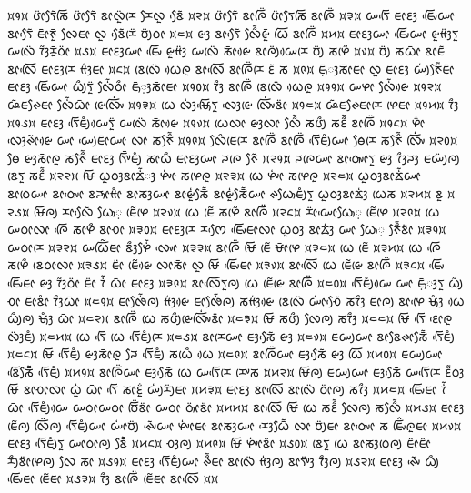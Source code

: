 \noindent
᰿᱁᰿ ᰂᰦᰮᰛᰧᰶᰕᰩ ᰂᰦᰮᰛᰧᰶ ᰣᰦᰜᰬᰮᰌᰨ ᰌᰧᰜᰬ ᰣᰧᰵᰶ ᰿᱂᰿ ᰂᰦᰮᰛᰧᰶ ᰣᰦᰍᰩᰮ ᰂᰦᰮᰛᰧᰕᰩ ᰣᰦᰍᰩᰮ ᰿᱃᰿ ᰠᰛᰩᰵ ᰀᰦᰚᰫ ᰀᰤᰩᰵᰠᰦ ᰣᰦᰛᰧᰵᰶ ᰀᰦᰳᰉᰬᰳ ᰜᰧᰀᰦ ᰜᰬ ᰣᰧᰵᰶᰌᰨᰮ ᰗᰪᰮᰓᰦ ᰿᱄᰿ ᰡᰫ ᰣᰦᰛᰧᰵᰶ ᰜᰧᰰᰶᰡᰬᰳ ᰃᰩ ᰣᰦᰍᰩᰮ ᰿᱅᰿ ᰀᰦᰚᰫᰠᰦ ᰀᰤᰩᰵᰠᰦ ᰡᰬᰙᰫᰮᰛᰬ ᰠᰜᰨᰮ ᰅᰫᰰᰌᰬᰳᰓᰦᰮ ᰿᱆᰿ ᰀᰦᰚᰫᰠᰦ ᰀᰤᰩᰵ ᰡᰬᰙᰫᰮ ᰠᰜᰨᰮ ᰕᰦᰳᰡᰴ ᰣᰦᰍᰪᰮᰠᰴᰌᰨ ᰗᰪᰮ ᰕᰋᰨᰰ ᰿᱇᰿ ᰗᰪᰮ ᰕᰃᰦᰳ ᰣᰦᰀᰶ ᰣᰦᰜᰩᰵ ᰀᰦᰚᰫᰌᰨ ᰙᰫᰭᰀᰦ ᰿᱈᰿ ᰣᰨᰜᰨᰮ ᰃᰴᰍᰬ ᰣᰦᰜᰩᰵ ᰣᰦᰍᰩᰮᰌᰨ ᰚᰶ ᰕ ᰿᱉᰿ ᰀ᰷ᰥᰳᰫᰕᰦᰳᰀᰦ ᰜᰬ ᰀᰦᰚᰫ ᰠᰪᰭᰉᰧᰮᰶᰀᰦᰳ ᰀᰦᰚᰫ ᰀᰤᰩᰵᰠᰦ ᰃᰪᰰᰛᰬᰮ ᰜᰧᰭᰶᰓᰦᰰ ᰀᰥᰳ᰷ᰫᰕᰦᰳᰀᰦ ᰿᱁᱀᰿ ᰅᰫᰰ ᰣᰦᰍᰩᰮ ᰣᰨᰜᰨᰮ ᰃᰴᰍᰬ ᰿᱁᱁᰿ ᰠᰋᰦ ᰜᰧᰭᰶᰡᰴ ᰿᱁᱂᰿ ᰘᰶᰀᰊᰧᰀᰦ ᰜᰧᰭᰶᰃᰦᰳ ᰡᰨᰜᰤᰩᰭ ᰿᱁᱃᰿ ᰃᰨ ᰜᰫᰭᰝᰥᰩᰵᰛᰬ ᰜᰫᰵᰡᰨ ᰜᰤᰩᰭᰣᰦᰮ ᰿᱁᱄᰿ ᰘᰶᰀᰊᰧᰀᰦᰌᰨ ᰋᰨᰀᰦ ᰿᱁᱅᰿ ᰅᰫᰰ ᰿᱁᱆᰿ ᰀᰦᰚᰫ ᰛᰩᰵᰀᰪᰱᰠᰴᰛᰬᰮ ᰠᰜᰨᰮ ᰕᰦᰳᰡᰴ ᰿᱁᱇᰿ ᰃᰨᰜᰦ ᰡᰫᰜᰦ ᰜᰧᰰᰶ ᰕᰂᰪᰰ ᰕᰚᰰᰶ ᰣᰦᰍᰩᰮ ᰿᱁᱈᰿ ᰋᰦᰯ ᰜᰫᰵᰊᰦᰲᰡᰴ ᰠᰦ ᰠᰪᰵᰀᰦᰳᰠᰦ ᰜᰦ ᰕᰉᰧᰰᰶ ᰿᱁᱉᰿ ᰜᰧᰰᰀᰨᰌᰨ ᰣᰦᰍᰩᰮ ᰣᰦᰍᰩᰮ ᰛᰩᰵᰀᰪᰱᰠᰦ ᰟᰧᰌᰨ ᰕᰉᰧᰰᰶ ᰜᰤᰩᰭ ᰿᱂᱀᰿ ᰟᰧ ᰡᰫᰕᰦᰳᰍᰬ ᰕᰉᰧᰰᰶ ᰀᰦᰚᰫ ᰛᰤᰩᰳᰀᰪᰱ ᰕᰦᰃᰰ ᰀᰦᰚᰫᰠᰦ ᰎᰍᰨ ᰉᰧᰶ ᰿᱂᱁᰿ ᰎᰍᰨᰠᰦ ᰣᰦᰓᰥᰤᰦᰵᰛᰬ ᰡᰫ ᰅᰫᰰᰎᰫ ᰀᰠᰪᰮᰍᰪ ᰣᰨᰛᰬ ᰕᰚᰰᰶ ᰿᱂᱂᰿ ᰝᰩ ᰃᰬᰓᰫᰣᰦᰇᰭᰶᰫ ᰋᰤᰦᰭ ᰕᰋᰨᰍᰬ ᰿᱂᱃᰿ ᰃᰨ ᰋᰤᰦᰭ ᰕᰋᰨᰍᰬ ᰿᱂᱄᰿ ᰃᰬᰓᰫᰣᰦᰇᰭᰶᰠᰦ ᰣᰦᰓᰨᰠᰦ ᰣᰦᰓᰥᰤᰦᰵ ᰣᰎᰥᰦᰙᰦᰱ ᰣᰦᰕᰫᰠᰦ ᰣᰦᰡᰬᰭᰕᰧᰳᰶ ᰣᰦᰡᰬᰭᰕᰧᰳᰶᰠᰦ ᰊᰃᰥᰧᰀᰪᰱᰛᰬ ᰃᰬᰓᰫᰣᰦᰇᰫᰭ ᰃᰨᰕ ᰿᱂᱅᰿ ᰣᰬ ᰿᱂᱆᰿ ᰝᰩᰍᰪ ᰌᰦᰜᰧᰵᰶ ᰃᰥᰧ᰷ ᰀᰨᰲᰋᰨ ᰿᱂᱇᰿ ᰃᰨ ᰀᰨᰲ ᰕᰋᰨᰰ ᰣᰦᰍᰩᰮ ᰿᱂᱈᰿ ᰌᰦᰮᰠᰦᰵᰃᰥᰧ᰷ ᰀᰨᰲᰋᰨ ᰿᱂᱉᰿ ᰃᰨ ᰠᰓᰦᰜᰦ ᰍᰩᰵ ᰕᰦᰋᰰ ᰣᰦᰆᰦ ᰿᱃᱀᰿ ᰀᰦᰚᰫᰌᰨ ᰌᰔᰧᰵ ᰀᰤᰩᰵᰀᰦᰜᰦ ᰃᰬᰓᰫ ᰣᰦᰇᰫᰭ ᰠᰦ ᰃᰥᰧ᰷ ᰉᰧᰰᰶᰣᰦᰮ ᰿᱃᱁᰿ ᰠᰓᰦᰌᰨ ᰿᱃᱂᰿ ᰠᰃᰩᰲᰀᰦ ᰣᰫᰰᰋᰧᰭᰶ ᰜᰤᰦᰵ ᰿᱃᱃᰿ ᰣᰦᰍᰩᰮ ᰝᰩ ᰀᰨᰲ ᰝᰦᰳᰋᰨ ᰿᱃᱄᰿ ᰃᰨ ᰀᰨᰲ ᰿᱃᱅᰿ ᰃᰨ ᰍᰩᰵ ᰕᰋᰨᰰ ᰣᰨᰓᰦᰜᰦ ᰿᱃᱆᰿ ᰀᰦᰮ ᰀᰨᰲᰡᰴ ᰜᰦᰕᰦᰳ ᰜᰬ ᰝᰩ ᰀᰤᰩᰵᰀᰦ ᰿᱃᱇᰿ ᰣᰦᰜᰩᰵ ᰃᰨ ᰀᰨᰲᰡᰨ ᰣᰦᰍᰩᰮ ᰿᱃᱈᰿ ᰀᰤᰩᰵ ᰀᰤᰩᰵᰀᰦ ᰡᰫ ᰅᰫᰰᰓᰦᰮ ᰀᰦᰮ ᰅᰭᰶ ᰃᰦᰳ ᰀᰦᰚᰫ ᰿᱃᱉᰿ ᰣᰦᰜᰩᰵᰛᰬᰍᰪ ᰃᰨ ᰀᰨᰲᰡᰨ ᰣᰦᰍᰩᰮ ᰿᱄᱀᰿ ᰛᰩᰵᰀᰪᰱᰠᰴ ᰠᰦ ᰀ᰷ᰥᰳᰫᰛᰬ ᰃᰪᰰ ᰆᰦ ᰀᰦᰳᰣᰦᰱ ᰅᰫᰰᰃᰦᰳ ᰿᱄᱁᰿ ᰀᰦᰒᰧᰭᰶᰍᰪ ᰙᰫᰭᰡᰴ ᰀᰦᰒᰧᰭᰶᰍᰪ ᰕᰙᰫᰭᰡᰴ ᰣᰨᰜᰨᰮ ᰠᰦᰭᰆᰧᰵᰶ ᰕᰅᰫᰰ ᰀᰦᰳᰍᰪ ᰣᰦᰋᰨᰵ ᰝᰥᰫᰱ ᰃᰴ ᰃᰪᰰᰍᰪ ᰝᰥᰫᰱ ᰃᰦᰳ ᰿᱄᱂᰿ ᰣᰦᰍᰩᰮ ᰃᰨ ᰕᰂᰪᰰᰡᰨᰜᰤᰩᰭᰣᰦᰮ ᰿᱄᱃᰿ ᰝᰩ ᰕᰂᰪᰰ ᰜᰧᰍᰪ ᰕᰅᰫᰰ ᰿᱄᱄᰿ ᰝᰩ ᰛᰩᰵ ᰚᰦᰵᰍᰬ ᰜᰫᰮᰀᰪᰱ ᰿᱄᱅᰿ ᰃᰨ ᰛᰩᰵ ᰃᰨ ᰛᰩᰵᰀᰪᰱᰌᰨ ᰿᱄᱆᰿ ᰣᰦᰌᰨᰠᰦ ᰀᰫᰕᰧᰵᰶ ᰡᰫ ᰿᱄᱇᰿ ᰀᰠᰪᰠᰦ ᰣᰦᰣᰧᰊᰦᰕᰧᰳᰶ ᰛᰩᰵᰀᰪᰱ ᰿᱄᱈᰿ ᰝᰩ ᰛᰩᰵᰀᰪᰱ ᰡᰫᰕᰦᰳᰍᰬ ᰎᰧ ᰛᰩᰵᰀᰪᰱ ᰕᰃᰨᰰ ᰃᰴ ᰿᱄᱉᰿ ᰣᰦᰍᰩᰮᰠᰦ ᰀᰫᰕᰧᰵᰶ ᰡᰫ ᰃᰩ ᰿᱅᱀᰿ ᰀᰠᰪᰠᰦ ᰣᰩᰵᰕᰧᰳᰶ ᰛᰩᰵᰀᰪᰱ ᰿᱅᱁᰿ ᰣᰦᰍᰩᰮᰠᰦ ᰀᰫᰕᰧᰵᰶ ᰃᰨ ᰠᰛᰩᰵᰌᰨ ᰌᰤᰨᰕ ᰿᱅᱂᰿ ᰝᰩᰍᰪ ᰀᰠᰪᰠᰦ ᰀᰫᰕᰧᰵᰶ ᰠᰛᰩᰵᰌᰨ ᰚᰮᰶᰓᰫ ᰝᰩ ᰣᰦᰆᰦᰜᰦ ᰃᰬᰭ ᰃᰦᰳ ᰛᰩᰵ ᰕᰦᰚᰬᰯ ᰠᰪᰭᰌᰪᰮᰀᰦ ᰿᱅᱃᰿ ᰀᰦᰚᰫ ᰣᰦᰜᰩᰵ ᰣᰦᰜᰨᰮ ᰓᰦᰮᰍᰪ ᰕᰅᰫᰰ ᰿᱅᱄᰿ ᰀᰤᰩᰵᰀᰦ ᰅᰭᰶ ᰃᰦᰳ ᰛᰩᰵᰀᰪᰱᰠᰴ ᰠᰓᰦᰠᰓᰦ ᰗᰩᰮᰣᰦᰮ ᰠᰓᰦ ᰓᰥᰦᰮᰣᰦᰮ ᰿᱅᱅᰿ ᰣᰦᰜᰩᰵ ᰝᰩ ᰃᰨ ᰕᰚᰰᰶ ᰜᰧᰍᰪ ᰕᰜᰧᰰᰶ ᰿᱅᱆᰿ ᰀᰦᰚᰫ ᰀᰨᰲᰍᰪ ᰜᰩᰮᰍᰪ ᰛᰩᰵᰀᰪᰱᰠᰦ ᰠᰦᰭᰗᰪᰮ ᰊᰤᰵᰶᰠᰦ ᰋᰤᰦᰭᰀᰦ ᰣᰦᰕᰫᰠᰦ ᰌᰫᰵᰃᰧᰳᰶ ᰜᰦ ᰗᰪᰮᰀᰦ ᰣᰦᰓᰥᰤᰦᰵ ᰕ ᰀᰤᰩᰯᰍᰬᰀᰦ ᰿᱅᱇᰿ ᰀᰦᰚᰫ ᰛᰩᰵᰀᰪᰱᰛᰬ ᰠᰦᰓᰦᰍᰪ ᰣᰧᰳᰶ ᰿᱅᱈᰿ ᰆᰫᰍᰪ ᰿᱅᱉᰿ ᰝᰩ ᰋᰤᰦᰭᰣᰦᰮ ᰿᱆᱀᰿ ᰣᰨᰛᰬ ᰃᰨ ᰣᰦᰕᰫᰓᰨᰍᰪ ᰀᰦᰮᰀᰦᰮ ᰌᰪᰰᰣᰦᰮᰋᰨᰍᰪ ᰜᰧ ᰕᰦ ᰿᱆᱁᰿ ᰀᰦᰚᰫ ᰛᰩᰵᰀᰪᰱᰠᰦ ᰊᰰᰶᰀᰦ ᰣᰦᰜᰨᰮ ᰙᰫᰭᰍᰪ ᰣᰦᰛᰤᰫᰮ ᰅᰫᰰᰍᰪ ᰿᱆᱂᰿ ᰀᰦᰚᰫ ᰊᰤᰵᰶ ᰃᰪᰰ ᰀᰤᰩᰵᰀᰦ ᰀᰨᰲᰀᰦ ᰿᱆᱃᰿ ᰅᰫᰰ ᰣᰦᰍᰩᰮ ᰀᰨᰲᰀᰦ ᰣᰦᰜᰩᰵ ᰿᰿ 

\noindent

\noindent
\bye
\noindent
